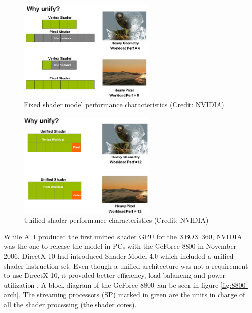\begin{figure}[ht]
    \centering
    \includegraphics[width=0.6\textwidth]{img/classic-model-gpu-idle-units.png}
    \captionsetup{justification=centering}
    \caption{Fixed shader model performance characteristics (Credit: NVIDIA)}
    \label{fig:gpu-fixed-shader-perf}
\end{figure}

\begin{figure}[ht]
    \centering
    \includegraphics[width=0.6\textwidth]{img/unified-shader-gpu-utilization.png}
    \captionsetup{justification=centering}
    \caption{Unified shader performance characteristics (Credit: NVIDIA)}
    \label{fig:gpu-unified-shader-perf}
\end{figure}

While ATI produced the first unified shader GPU for the XBOX 360, NVIDIA was the one  to release the model in PCs with the GeForce 8800 in November 2006. DirectX 10 had introduced Shader Model 4.0 which included a unified shader instruction set. Even though a unified architecture was not a requirement to use DirectX 10, it provided better efficiency, load-balancing and power utilization \cite{geforce_8800_architecture}. A block diagram of the GeForce 8800 can be seen in figure \ref{fig:8800-arch}. The streaming processors (SP) marked in green are the units in charge of all the shader processing (the shader cores).

